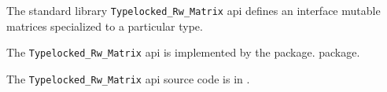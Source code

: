 
The standard library {\tt Typelocked\_Rw\_Matrix} api defines an interface mutable matrices specialized to a particular type.

The {\tt Typelocked\_Rw\_Matrix} api is implemented by the 
 package.
 package.

The {\tt Typelocked\_Rw\_Matrix} api source code is in .
